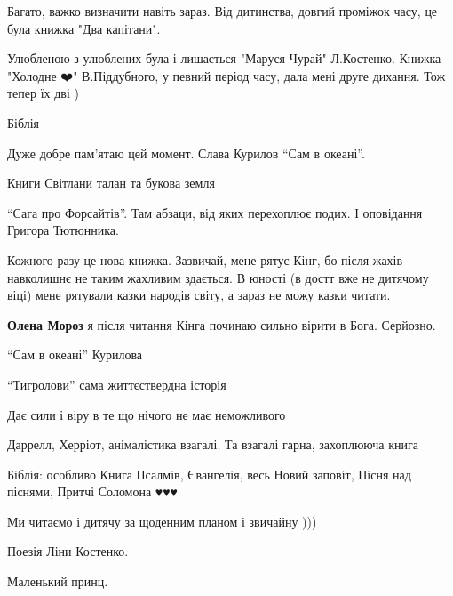Багато, важко визначити навіть зараз. Від дитинства, довгий проміжок часу, це була книжка "Два капітани".

Улюбленою з улюблених була і лишається "Маруся Чурай" Л.Костенко. Книжка
"Холодне ❤️" В.Піддубного, у певний період часу, дала мені друге дихання. Тож
тепер їх дві )


Біблія


Дуже добре пам'ятаю цей момент. Слава Курилов \enquote{Сам в океані}.


Книги Світлани талан та букова земля


\enquote{Сага про Форсайтів}. Там абзаци, від яких перехоплює подих. І оповідання Григора Тютюнника.


Кожного разу це нова книжка. Зазвичай, мене рятує Кінг, бо після жахів
навколишнє не таким жахливим здається. В юності (в достт вже не дитячому віці)
мене рятували казки народів світу, а зараз не можу казки читати.

\begin{itemize} %
\textbf{Олена Мороз} я після читання Кінга починаю сильно вірити в Бога. Серйозно.
\end{itemize} %


\enquote{Сам в океані} Курилова


\enquote{Тигролови} сама життєствердна історія

Дає сили і віру в те що нічого не має неможливого


Даррелл, Херріот, анімалістика взагалі. Та взагалі гарна, захоплююча книга


Біблія: особливо Книга Псалмів, Євангелія, весь Новий заповіт, Пісня над піснями, Притчі Соломона ♥️♥️♥️

Ми читаємо і дитячу за щоденним планом і звичайну )))


Поезія Ліни Костенко.

Маленький принц.

